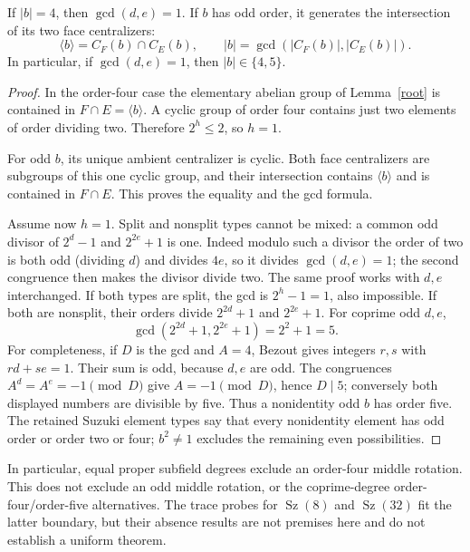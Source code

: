 \documentclass[11pt,a4paper]{article}
\newcommand{\Sz}{\operatorname{Sz}}
\begin{document}
\begin{proposition}\label{middle}
If $|b|=4$, then $\gcd(d,e)=1$. If $b$ has odd order, it generates
the intersection of its two face centralizers:
\[
 \langle b\rangle=C_F(b)\cap C_E(b),\qquad
 |b|=\gcd(|C_F(b)|,|C_E(b)|).
\]
In particular, if $\gcd(d,e)=1$, then $|b|\in\{4,5\}$.
\end{proposition}
\begin{proof}
In the order-four case the elementary abelian group of
Lemma~\ref{root} is contained in $F\cap E=\langle b\rangle$. A cyclic
group of order four contains just two elements of order dividing two.
Therefore $2^h\le2$, so $h=1$.

For odd $b$, its unique ambient centralizer is cyclic. Both face
centralizers are subgroups of this one cyclic group, and their
intersection contains $\langle b\rangle$ and is contained in
$F\cap E$. This proves the equality and the gcd formula.

Assume now $h=1$. Split and nonsplit types cannot be mixed: a common
odd divisor of $2^d-1$ and $2^{2e}+1$ is one. Indeed modulo such a
divisor the order of two is both odd (dividing $d$) and divides $4e$,
so it divides $\gcd(d,e)=1$; the second congruence then makes the
divisor divide two. The same proof works with $d,e$ interchanged.
If both types are split, the gcd is $2^h-1=1$, also impossible.
If both are nonsplit, their orders divide $2^{2d}+1$ and $2^{2e}+1$.
For coprime odd $d,e$,
\[
 \gcd(2^{2d}+1,2^{2e}+1)=2^2+1=5.
\]
For completeness, if $D$ is the gcd and $A=4$, Bezout gives integers
$r,s$ with $rd+se=1$. Their sum is odd, because $d,e$ are odd.
The congruences $A^d=A^e=-1\pmod D$ give $A=-1\pmod D$, hence
$D\mid5$; conversely both displayed numbers are divisible by five.
Thus a nonidentity odd $b$ has order five. The retained Suzuki element
types say that every nonidentity element has odd order or order two or
four; $b^2\ne1$ excludes the remaining even possibilities.
\end{proof}

In particular, equal proper subfield degrees exclude an order-four
middle rotation. This does not exclude an odd middle rotation, or the
coprime-degree order-four/order-five alternatives. The trace probes
for $\Sz(8)$ and $\Sz(32)$ fit the latter boundary, but their absence
results are not premises here and do not establish a uniform theorem.
\end{document}
